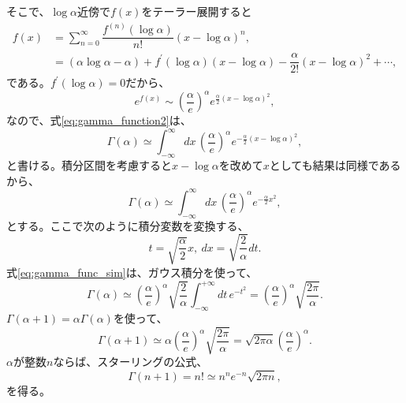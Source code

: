 そこで、$\log\alpha$近傍で$f(x)$をテーラー展開すると
\begin{align}
 f(x)&=\sum_{n=0}^\infty\dfrac{f^{(n)}(\log\alpha)}{n!}(x-\log\alpha)^n,\\
&=(\alpha\log\alpha-\alpha)+f^\prime(\log\alpha)(x-\log\alpha)-\dfrac{\alpha}{2!}(x-\log\alpha)^2+\cdots,
\end{align}
である。$f^\prime(\log\alpha)=0$だから、
\begin{equation}
 e^{f(x)}\sim\left(\dfrac{\alpha}{e}\right)^\alpha e^{\frac{\alpha}{2}(x-\log\alpha)^2},
\end{equation}
なので、式\eqref{eq:gamma_function2}は、
\begin{equation}
 \Gamma(\alpha)\simeq \int_{-\infty}^{\infty}dx\,\left(\dfrac{\alpha}{e}\right)^\alpha e^{-\frac{\alpha}{2}(x-\log\alpha)^2},
\end{equation}
と書ける。積分区間を考慮すると$x-\log\alpha$を改めて$x$としても結果は同様であるから、
\begin{equation}
 \Gamma(\alpha)\simeq\int_{-\infty}^{\infty}dx\,\left(\dfrac{\alpha}{e}\right)^\alpha e^{-\frac{\alpha}{2}x^2},\label{eq:gamma_func_sim}
\end{equation}
とする。ここで次のように積分変数を変換する、
\begin{equation}
 t=\sqrt{\dfrac{\alpha}{2}}x,\ dx=\sqrt{\dfrac{2}{\alpha}}dt.
\end{equation}
式\eqref{eq:gamma_func_sim}は、ガウス積分を使って、
\begin{equation}
 \Gamma(\alpha)\simeq\left(\dfrac{\alpha}{e}\right)^\alpha\sqrt{\dfrac{2}{\alpha}}\int_{-\infty}^{+\infty}dt\, e^{-t^2}=\left(\dfrac{\alpha}{e}\right)^\alpha\sqrt{\dfrac{2\pi}{\alpha}}.
\end{equation}
$\Gamma(\alpha +1)=\alpha\Gamma(\alpha)$を使って、
\begin{equation}
 \Gamma(\alpha +1)\simeq \alpha\left(\dfrac{\alpha}{e}\right)^\alpha\sqrt{\dfrac{2\pi}{\alpha}}=\sqrt{2\pi\alpha}\left(\dfrac{\alpha}{e}\right)^\alpha.
\end{equation}
$\alpha$が整数$n$ならば、スターリングの公式、
\begin{equation}
 \Gamma(n+1)=n!\simeq n^ne^{-n}\sqrt{2\pi n},
\end{equation}
を得る。